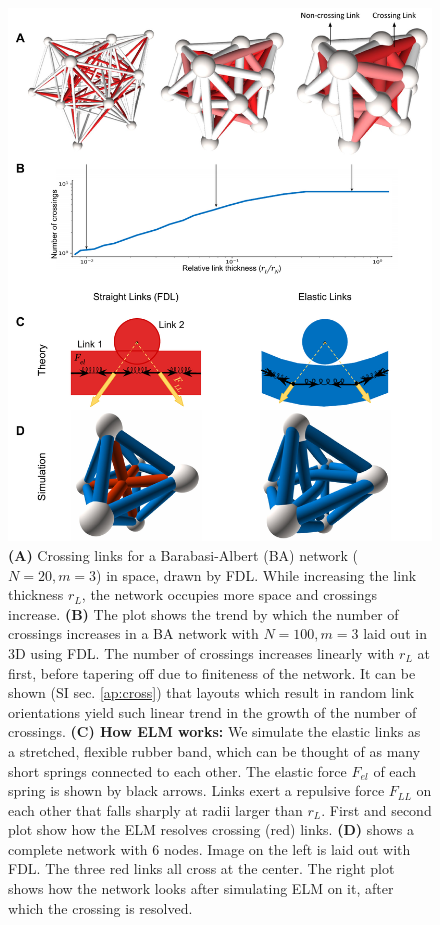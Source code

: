 \documentclass[nofootinbib,preprint,floatfix,titlepage,endfloats]{revtex4} %
\begin{document}
\begin{figure}
    \vspace{4cm}
    \centering
    \includegraphics[width=.9\columnwidth]{fig-09-19/crs-resolve-0617.pdf}
    \caption{\scriptsize
    {\bf (A)}  Crossing links for a Barabasi-Albert (BA) network ($N = 20, m = 3$) in space, drawn by FDL. While increasing the link thickness $r_L$, the network occupies more space and crossings increase. 
    {\bf (B)} The plot shows the trend by which the number of crossings increases in a BA network with $N=100, m =3$ laid out in 3D using FDL.
    The number of crossings increases linearly with $r_L$ at first, before tapering off due to finiteness of the network. It can be shown (SI sec. \ref{ap:cross}) that layouts which result in random link orientations yield such linear trend in the growth of the number of crossings.
    {\bf(C) How ELM works:} We simulate the elastic links as a stretched, flexible rubber band, which can be thought of as many short springs connected to each other. 
    The elastic force $F_{el}$ of each spring is shown by black arrows.
    Links exert a repulsive force $F_{LL}$  on each other that falls sharply at radii larger than $r_L$. 
    First and second plot show how the ELM resolves crossing (red) links. {\bf(D)} shows a complete network with 6 nodes. Image on the left is laid out with FDL. The three red links all cross at the center. The right plot shows how the network looks after simulating ELM on it, after which the crossing is resolved. 
    }     
    \label{fig:crossings}
\end{figure}
\end{document}
